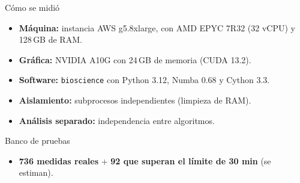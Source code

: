 \documentclass[10pt,aspectratio=169]{beamer}
\begin{document}
\begin{frame}{Cómo se midió}
    \begin{itemize}
        \setlength\itemsep{0.7em}
        \item \textbf{Máquina:} instancia AWS g5.8xlarge, con AMD EPYC 7R32 (32 vCPU) y 128\,GB de RAM.
        \item \textbf{Gráfica:} NVIDIA A10G con 24\,GB de memoria (CUDA 13.2).
        \item \textbf{Software:} \texttt{bioscience} con Python 3.12, Numba 0.68 y Cython 3.3.
        \item \textbf{Aislamiento:} subprocesos independientes (limpieza de RAM).
        \item \textbf{Análisis separado:} independencia entre algoritmos.
    \end{itemize}
\end{frame}

\begin{frame}{Banco de pruebas}
    \begin{table}
        \centering
        \renewcommand{\arraystretch}{1.4}
    \end{table}
    \vspace{0.2cm}
    \begin{itemize}
        \item \textbf{736 medidas reales} + \textbf{92 que superan el límite de 30 min} (se estiman).
    \end{itemize}
\end{frame}
\end{document}

